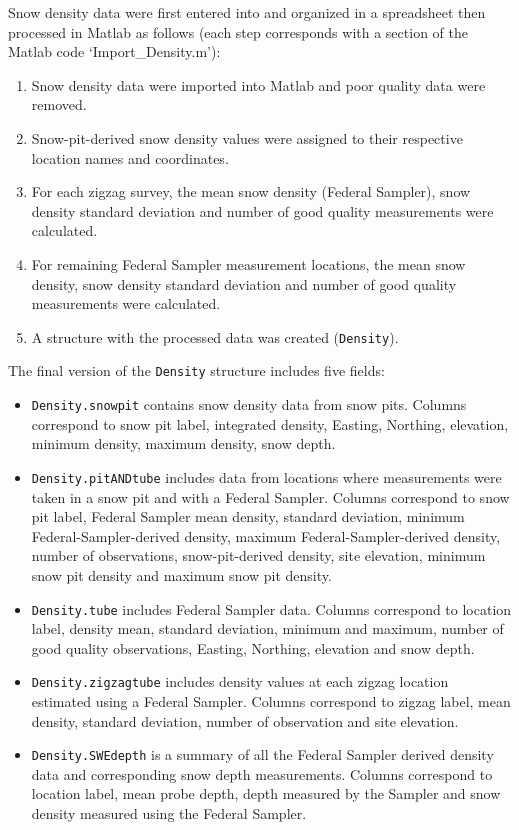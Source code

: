 \documentclass{sfuthesis}
\begin{document}
{\begin{appendices}
Snow density data were first entered into and organized in a spreadsheet then processed in Matlab as follows (each step corresponds with a section of the Matlab code `Import\_Density.m'): 
\begin{enumerate}
\item Snow density data were imported into Matlab and poor quality data were removed. 
\item Snow-pit-derived snow density values were assigned to their respective location names and coordinates.
\item For each zigzag survey, the mean snow density (Federal Sampler), snow density standard deviation and number of good quality measurements were calculated.
\item For remaining Federal Sampler measurement locations, the mean snow density, snow density standard deviation and number of good quality measurements were calculated. 
\item A structure with the processed data was created (\texttt{Density}).
\end{enumerate}

The final version of the \texttt{Density} structure includes five fields:
\begin{itemize}
\item[]\texttt{Density.snowpit} contains snow density data from snow pits. Columns correspond to snow pit label, integrated density, Easting, Northing, elevation, minimum density, maximum density, snow depth.
\item[]\texttt{Density.pitANDtube} includes data from locations where measurements were taken in a snow pit and with a Federal Sampler. Columns correspond to snow pit label, Federal  Sampler mean density, standard deviation, minimum Federal-Sampler-derived density, maximum Federal-Sampler-derived density, number of observations, snow-pit-derived density, site elevation, minimum snow pit density and maximum snow pit density.
\item[]\texttt{Density.tube} includes Federal Sampler data. Columns correspond to location label, density mean, standard deviation, minimum and maximum, number of good quality observations, Easting, Northing, elevation and snow depth. 
\item[]\texttt{Density.zigzagtube} includes density values at each zigzag location estimated using a Federal Sampler. Columns correspond to zigzag label, mean density, standard deviation, number of observation and site elevation. 
\item[]\texttt{Density.SWEdepth} is a summary of all the Federal Sampler derived density data and corresponding snow depth measurements. Columns correspond to location label, mean probe depth, depth measured by the Sampler and snow density measured using the Federal Sampler. 
\end{itemize}


\end{appendices}}
\end{document}
